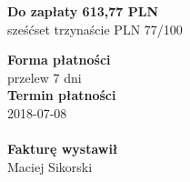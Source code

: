 \documentclass[a4paper,10pt]{article}
\begin{document}
  \noindent
  \begin{flushright}
  \textbf{\LARGE{Do zapłaty} 613,77 PLN}\\
  sześćset trzynaście PLN 77/100
  \end{flushright}

  \vfill
  \noindent
  \textbf{Forma płatności}\\
  przelew 7 dni\\
  \textbf{Termin płatności}\\
  2018-07-08\\
  \\
  
  \noindent
    \textbf{Fakturę wystawił}\\
    Maciej Sikorski
    
\end{document}
